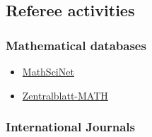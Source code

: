 \separator
\subsection{Referee activities}

\subsubsection{Mathematical databases}

\begin{itemize}

  \item[$\blacktriangleright$] \href{https://mathscinet.ams.org/mathscinet/}%
  {MathSciNet}
  
  \item[$\blacktriangleright$] \href{https://zbmath.org/}%
  {Zentralblatt-MATH}

\end{itemize}

\separator
\subsubsection{International Journals}

